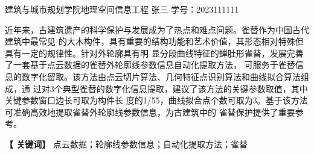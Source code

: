 \newpage


\centerline{\fangsong\bf{}}


\vskip 1cm

\begin{center}
	\kaishu
	\hspace{2cm}建筑与城市规划学院地理空间信息工程 \quad 张三 
	\vspace{5bp}
	\newline
	学号：2023111111
\end{center}

\vskip 10bp

{
\kaishu	
{} 
近年来，古建筑遗产的科学保护与发展成为了热点和难点问题。雀替作为中国古代建筑中最常见
的大木构件，具有重要的结构功能和艺术价值，其形态相对特殊但具有一定的规律性。针对外轮廓具有明
显分段曲线特征的蝉肚形雀替，发展完善了一套基于点云数据的雀替外轮廓线参数信息自动化提取方法，
可服务于雀替信息的数字化留取。该方法由点云切片算法、几何特征点识别算法和曲线拟合算法组成，通
过对3个典型雀替的数字化信息提取，建议了该方法的关键参数取值，其中关键参数窗口边长可取为构件长
度的1/55，曲线拟合点个数可取为3。基于该方法可准确高效地提取雀替外轮廓线参数信息，为古建筑中的
雀替保护提供了重要参考。

\vskip 10bp

\hspace{5bp} {\textbf{【 关键词】}} 
点云数据；轮廓线参数信息；自动化提取方法；雀替
}